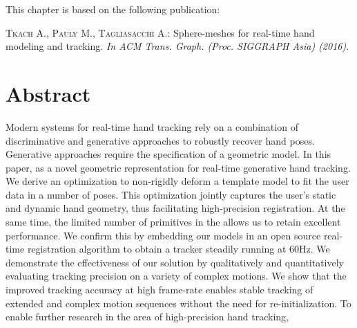 
This chapter is based on the following publication:

\begin{adjustwidth}{2.5em}{0pt}
\textsc{Tkach A., Pauly M., Tagliasacchi A.}: Sphere-meshes for real-time hand
modeling and tracking. \textit{In ACM Trans. Graph. (Proc. SIGGRAPH Asia) (2016)}.
\end{adjustwidth}

\section*{Abstract}

Modern systems for real-time hand tracking rely on a combination of discriminative and generative approaches to robustly recover hand poses. Generative approaches require the specification of a geometric model.
In this paper,  as a novel geometric representation for real-time generative hand tracking. 
% 
We derive an optimization to non-rigidly deform a template model to fit the user data in a number of poses.
% 
This optimization jointly captures the user's static and dynamic hand geometry, thus facilitating high-precision registration.
At the same time, the limited number of primitives in the  allows us to retain excellent  performance. We confirm this by embedding our models in an open source real-time registration algorithm to obtain a tracker steadily running at 60Hz.
%
We demonstrate the effectiveness of our solution by qualitatively and quantitatively evaluating tracking precision on a variety of complex motions. We show that the improved tracking accuracy at high frame-rate enables stable tracking of extended and complex motion sequences without the need for  re-initialization.
%
To enable further research in the area of high-precision hand tracking, 
